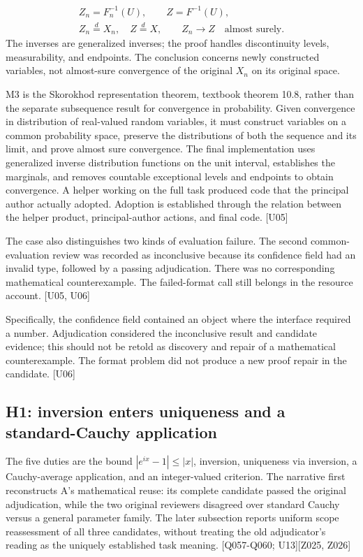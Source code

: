 \[
\begin{gathered}
Z_n=F_n^{-1}(U),\qquad Z=F^{-1}(U),\\
Z_n\overset{d}=X_n,\quad Z\overset{d}=X,\qquad
Z_n\longrightarrow Z\quad\text{almost surely}.
\end{gathered}
\]
The inverses are generalized inverses; the proof handles discontinuity levels, measurability, and endpoints. The conclusion concerns newly constructed variables, not almost-sure convergence of the original $X_n$ on its original space.

M3 is the Skorokhod representation theorem, textbook theorem 10.8, rather than the separate subsequence result for convergence in probability. Given convergence in distribution of real-valued random variables, it must construct variables on a common probability space, preserve the distributions of both the sequence and its limit, and prove almost sure convergence. The final implementation uses generalized inverse distribution functions on the unit interval, establishes the marginals, and removes countable exceptional levels and endpoints to obtain convergence. A helper working on the full task produced code that the principal author actually adopted. Adoption is established through the relation between the helper product, principal-author actions, and final code. [U05]

The case also distinguishes two kinds of evaluation failure. The second common-evaluation review was recorded as inconclusive because its confidence field had an invalid type, followed by a passing adjudication. There was no corresponding mathematical counterexample. The failed-format call still belongs in the resource account. [U05, U06]

Specifically, the confidence field contained an object where the interface required a number. Adjudication considered the inconclusive result and candidate evidence; this should not be retold as discovery and repair of a mathematical counterexample. The format problem did not produce a new proof repair in the candidate. [U06]

\subsection[H1: inversion enters uniqueness and a standard-Cauchy application]{\texorpdfstring{\protect\hypertarget{g13}{}H1: inversion enters uniqueness and a standard-Cauchy application}{H1: inversion enters uniqueness and a standard-Cauchy application}}
The five duties are the bound $|e^{ix}-1|\leq |x|$, inversion, uniqueness via inversion, a Cauchy-average application, and an integer-valued criterion. The narrative first reconstructs A's mathematical reuse: its complete candidate passed the original adjudication, while the two original reviewers disagreed over standard Cauchy versus a general parameter family. The later subsection reports uniform scope reassessment of all three candidates, without treating the old adjudicator's reading as the uniquely established task meaning. [Q057-Q060; U13][Z025, Z026]

